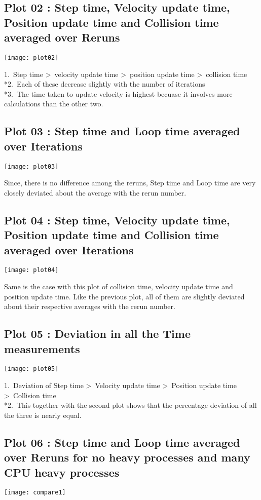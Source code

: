 \documentclass[10pt]{article}
\begin{document}
\subsection{Plot 02 : Step time, Velocity update time, Position update time and Collision time averaged over Reruns}
\begin{center}
\texttt{[image: plot02]}
\end{center}
1.\ Step time \textgreater \ velocity update time \textgreater \ position update time \textgreater \ collision time
\\*2.\ Each of these decrease slightly with the number of iterations
\\*3.\ The time taken to update velocity is highest becuase it involves more calculations than the other two.
\subsection{Plot 03 : Step time and Loop time averaged over Iterations}
\begin{center}
\texttt{[image: plot03]}
\end{center}
Since, there is no difference among the reruns, Step time and Loop time are very closely deviated about the average with the rerun number.
\subsection{Plot 04 : Step time, Velocity update time, Position update time and Collision time averaged over Iterations}
\begin{center}
\texttt{[image: plot04]}
\end{center}
Same is the case with this plot of collision time, velocity update time and position update time. Like the previous plot, all of them are slightly deviated about their respective averages with the rerun number.
\subsection{Plot 05 : Deviation in all the Time measurements}
\begin{center}
\texttt{[image: plot05]}
\end{center}
1.\ Deviation of Step time \textgreater \ Velocity update time \textgreater \ Position update time \textgreater \ Collision time
\\*2.\ This together with the second plot shows that the percentage deviation of all the three is nearly equal.
\subsection{Plot 06 : Step time and Loop time averaged over Reruns for no heavy processes and many CPU heavy processes}
\begin{center}
\texttt{[image: compare1]}
\end{center}
\end{document}
